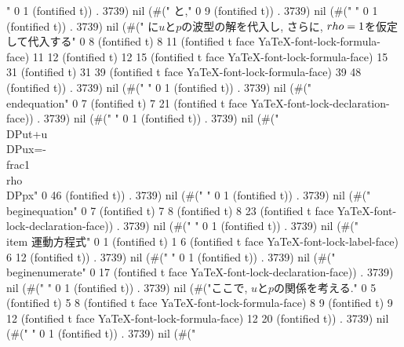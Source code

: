 " 0 1 (fontified t)) . 3739) nil (#("       と," 0 9 (fontified t)) . 3739) nil (#("
" 0 1 (fontified t)) . 3739) nil (#("       に$u$と$p$の波型の解を代入し, さらに, $\\rho=1$を仮定して代入する" 0 8 (fontified t) 8 11 (fontified t face YaTeX-font-lock-formula-face) 11 12 (fontified t) 12 15 (fontified t face YaTeX-font-lock-formula-face) 15 31 (fontified t) 31 39 (fontified t face YaTeX-font-lock-formula-face) 39 48 (fontified t)) . 3739) nil (#("
" 0 1 (fontified t)) . 3739) nil (#("       \\end{equation}" 0 7 (fontified t) 7 21 (fontified t face YaTeX-font-lock-declaration-face)) . 3739) nil (#("
" 0 1 (fontified t)) . 3739) nil (#("	\\DP{u}{t}+u\\DP{u}{x}=-\\frac{1}{\\rho}\\DP{p}{x}" 0 46 (fontified t)) . 3739) nil (#("
" 0 1 (fontified t)) . 3739) nil (#("       \\begin{equation}" 0 7 (fontified t) 7 8 (fontified t) 8 23 (fontified t face YaTeX-font-lock-declaration-face)) . 3739) nil (#("
" 0 1 (fontified t)) . 3739) nil (#(" \\item 運動方程式" 0 1 (fontified t) 1 6 (fontified t face YaTeX-font-lock-label-face) 6 12 (fontified t)) . 3739) nil (#("
" 0 1 (fontified t)) . 3739) nil (#("\\begin{enumerate}" 0 17 (fontified t face YaTeX-font-lock-declaration-face)) . 3739) nil (#("
" 0 1 (fontified t)) . 3739) nil (#("ここで, $u$と$p$の関係を考える." 0 5 (fontified t) 5 8 (fontified t face YaTeX-font-lock-formula-face) 8 9 (fontified t) 9 12 (fontified t face YaTeX-font-lock-formula-face) 12 20 (fontified t)) . 3739) nil (#("
" 0 1 (fontified t)) . 3739) nil (#("
